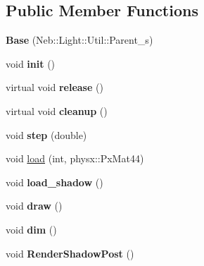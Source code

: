 \subsection*{\-Public \-Member \-Functions}
\begin{DoxyCompactItemize}
\item 
\hypertarget{classNeb_1_1Light_1_1Base_ab76457ec9dca523cd4e24f71b2602139}{{\bfseries \-Base} (\-Neb\-::\-Light\-::\-Util\-::\-Parent\-\_\-s)}\label{classNeb_1_1Light_1_1Base_ab76457ec9dca523cd4e24f71b2602139}

\item 
\hypertarget{classNeb_1_1Light_1_1Base_a4a9c112c52805f2c7a5b33d0f07171be}{void {\bfseries init} ()}\label{classNeb_1_1Light_1_1Base_a4a9c112c52805f2c7a5b33d0f07171be}

\item 
\hypertarget{classNeb_1_1Light_1_1Base_abe888a496b2e7316e2f04e21d324d132}{virtual void {\bfseries release} ()}\label{classNeb_1_1Light_1_1Base_abe888a496b2e7316e2f04e21d324d132}

\item 
\hypertarget{classNeb_1_1Light_1_1Base_a3f309821eb418f783f6fdb6cdfb4fef6}{virtual void {\bfseries cleanup} ()}\label{classNeb_1_1Light_1_1Base_a3f309821eb418f783f6fdb6cdfb4fef6}

\item 
\hypertarget{classNeb_1_1Light_1_1Base_afca74a5b128bb6940214ecdeafa50d04}{void {\bfseries step} (double)}\label{classNeb_1_1Light_1_1Base_afca74a5b128bb6940214ecdeafa50d04}

\item 
void \hyperlink{classNeb_1_1Light_1_1Base_ad621061e0be86708f0cbf7e300bc0c1e}{load} (int, physx\-::\-Px\-Mat44)
\item 
\hypertarget{classNeb_1_1Light_1_1Base_a903492950fc35bcfdafcbb91d42dddf2}{void {\bfseries load\-\_\-shadow} ()}\label{classNeb_1_1Light_1_1Base_a903492950fc35bcfdafcbb91d42dddf2}

\item 
\hypertarget{classNeb_1_1Light_1_1Base_af8a85af5b35db73ee6e260eb5d16ec0b}{void {\bfseries draw} ()}\label{classNeb_1_1Light_1_1Base_af8a85af5b35db73ee6e260eb5d16ec0b}

\item 
\hypertarget{classNeb_1_1Light_1_1Base_a0f2d5367bfdcb1911153bd4a21c26e50}{void {\bfseries dim} ()}\label{classNeb_1_1Light_1_1Base_a0f2d5367bfdcb1911153bd4a21c26e50}

\item 
\hypertarget{classNeb_1_1Light_1_1Base_a132bb5f66b3b590aa55f53ee17a67c4a}{void {\bfseries \-Render\-Shadow\-Post} ()}\label{classNeb_1_1Light_1_1Base_a132bb5f66b3b590aa55f53ee17a67c4a}


\end{DoxyCompactItemize}
